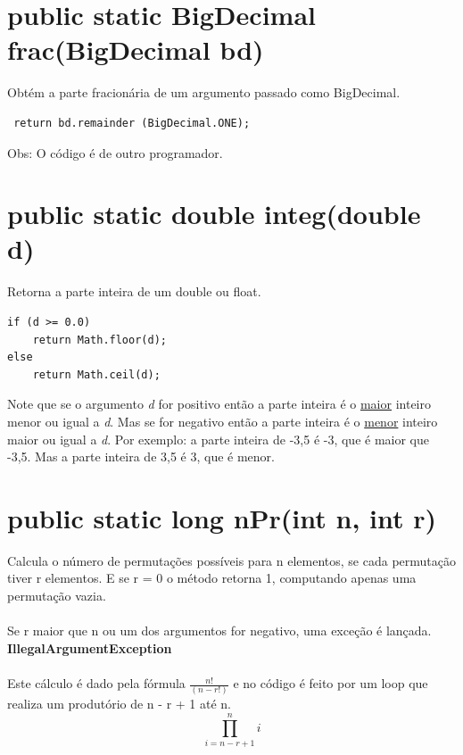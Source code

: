 \documentclass[a4paper,12pt,openany]{book}
\begin{document}
\section*{public static BigDecimal frac(BigDecimal bd)}

Obtém a parte fracionária de um argumento passado como BigDecimal.
\begin{lstlisting}
 return bd.remainder (BigDecimal.ONE);
\end{lstlisting} 

Obs: O código é de outro programador.

\section*{public static double integ(double d)}

Retorna a parte inteira de um double ou float.
\begin{lstlisting}
if (d >= 0.0) 
	return Math.floor(d);
else 
	return Math.ceil(d);
\end{lstlisting} 

Note que se o argumento \textit{d} for positivo então a parte inteira é o \underline{maior} inteiro menor ou igual a \textit{d}. Mas se for negativo então a parte inteira é o \underline{menor} inteiro maior ou igual a \textit{d}. Por exemplo: a parte inteira de -3,5 é -3, que é maior que -3,5. Mas a parte inteira de 3,5 é 3, que é menor.

\section*{public static long nPr(int n, int r)}
\label{metodo:nPr01}

Calcula o número de permutações possíveis para n elementos, se cada permutação tiver r elementos. E se r = 0 o método retorna 1, computando apenas uma permutação vazia.
\\
\\
Se r maior que n ou um dos argumentos for negativo, uma exceção é lançada. \textbf{IllegalArgumentException}
\\
\\
Este cálculo é dado pela fórmula $\frac{n!}{(n-r!)}$ e no código é feito por um loop que realiza um produtório de n - r + 1 até n.
$$
\prod_{i = n - r + 1}^{n} i
$$
\end{document}
